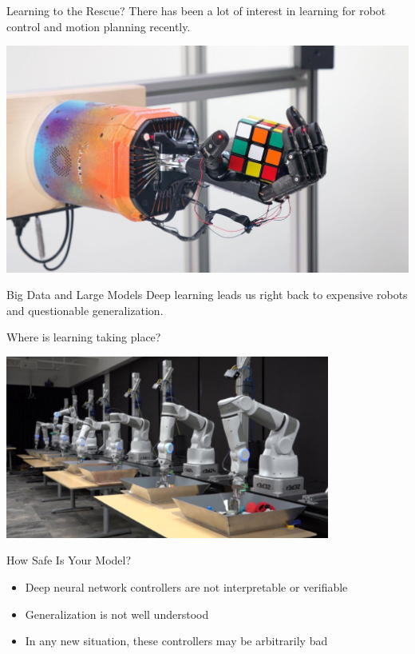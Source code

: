 \documentclass{beamer}
\begin{document}
\begin{frame}{Learning to the Rescue?}
  There has been a lot of interest in learning for robot control and motion
  planning recently.

  \begin{center}
    \includegraphics[keepaspectratio,width=\textwidth]{assets/openai_hand}
  \end{center}
\end{frame}

\begin{frame}{Big Data and Large Models}
  Deep learning leads us right back to expensive robots and questionable
  generalization. 

  Where is learning taking place?

  \begin{center}
    \includegraphics[keepaspectratio,width=0.8\textwidth]{assets/arm_farm}
  \end{center}
\end{frame}

\begin{frame}{How Safe Is Your Model?}
  \begin{itemize}
    \item Deep neural network controllers are not interpretable or verifiable
    \item Generalization is not well understood
    \item In any new situation, these controllers may be arbitrarily bad
  \end{itemize}
\end{frame}
\end{document}

